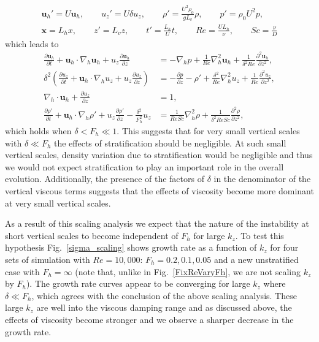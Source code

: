 \begin{align}
\textbf{u}_{h}' = U\textbf{u}_{h},\qquad u_{z}'=U\delta u_{z},\qquad \rho' =\frac{U^{2}\rho_{0}}{gL_{v}}\rho,\qquad p'=\rho_{0}U^{2}p, \nonumber\\
\textbf{x}=L_{h}x,\qquad z'=L_{v}z,\qquad t' = \frac{L_{h}}{U}{t},\qquad Re=\frac{UL_{h}}{\nu},\qquad Sc = \frac{\nu}{D}
\end{align} 
which leads to  
\begin{align}
\frac{\partial \textbf{u}_{h}}{\partial t} + \textbf{u}_{h}\cdot\nabla_{h}\textbf{u}_{h}+u_{z}\frac{\partial \textbf{u}_{h}}{\partial z} &= -\nabla_{h}p + \frac{1}{Re}\nabla_{h}^{2}\textbf{u}_{h} +  \frac{1}{\delta^{2}Re}\frac{\partial^{2}\textbf{u}_{h}}{\partial z^{2}},\\
\delta^{2}\left(\frac{\partial u_{z}}{\partial t} + \textbf{u}_{h}\cdot\nabla_{h}u_{z}+u_{z}\frac{\partial u_{z}}{\partial z}\right) &= -\frac{\partial p}{\partial z} - \rho' + \frac{\delta^{2}}{Re}\nabla_{h}^{2}u_{z} + \frac{1}{Re}\frac{\partial^{2}u_{z}}{\partial z^{2}},\\
\nabla_{h}\cdot\textbf{u}_{h} + \frac{\partial u_{z}}{\partial z} &=1,\\
\frac{\partial \rho'}{\partial t} + \textbf{u}_{h}\cdot\nabla_{h}\rho' + u_{z}\frac{\partial \rho'}{\partial z} -\frac{\delta^{2}}{F_{h}^{2}}u_{z}&=\frac{1}{ReSc}\nabla_{h}^{2}\rho + \frac{1}{\delta^{2}ReSc}\frac{\partial^{2}\rho}{\partial z^{2}},
\end{align}
which holds when $\delta<F_{h}\ll 1$. This suggests that for very small vertical scales with $\delta \ll  F_{h}$ the effects of stratification should be negligible. At such small vertical scales, density variation due to stratification would be negligible and thus we would not expect stratification to play an important role in the overall evolution. Additionally, the presence of the factors of $\delta$ in the denominator of the vertical viscous terms suggests that the effects of viscosity become more dominant at very small vertical scales.  

As a result of this scaling analysis we expect that the nature of the instability at short vertical scales to become independent of $F_{h}$ for large $k_{z}$. To test this hypothesis Fig.~\ref{sigma_scaling} shows growth rate as a function of $k_{z}$ for four sets of simulation with $Re=10{,}000$: $F_{h}=0.2,0.1,0.05$ and a new unstratified case with $F_{h}=\infty$ (note that, unlike in Fig.~\ref{FixReVaryFh}, we are not scaling $k_{z}$ by $F_{h}$). The growth rate curves appear to be converging for large $k_{z}$ where $\delta \ll F_{h}$, which agrees with the conclusion of the above scaling analysis. These large $k_{z}$ are well into the viscous damping range and as discussed above, the effects of viscosity become stronger and we observe a sharper decrease in the growth rate.


